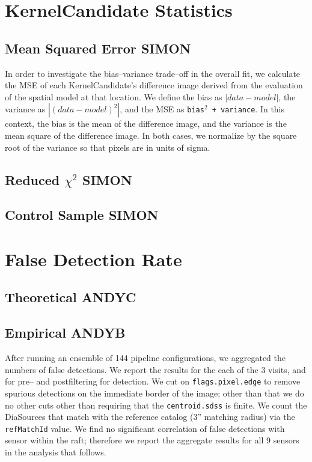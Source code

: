 \documentclass[prd, nofootinbib, floatfix, 11pt,tightenlines,times]{article}
\begin{document}
\section{KernelCandidate Statistics}

\subsection{Mean Squared Error {\bf SIMON}}

In order to investigate the bias--variance trade--off in the overall
fit, we calculate the MSE of each KernelCandidate's difference image
derived from the evaluation of the spatial model at that location.  We
define the bias as $\left| data - model \right|$, the variance as
$\left| (data - model)^2 \right|$, and the MSE as {\tt bias$^2$ +
  variance}.  In this context, the bias is the mean of the difference
image, and the variance is the mean square of the difference image.
In both cases, we normalize by the square root of the variance so that
pixels are in units of sigma.

\subsection{Reduced $\chi^2$ {\bf SIMON}}

\subsection{Control Sample {\bf SIMON}}

\section{False Detection Rate}

\subsection{Theoretical {\bf ANDYC}}

\subsection{Empirical {\bf ANDYB}}

After running an ensemble of 144 pipeline configurations, we
aggregated the numbers of false detections.  We report the results for
the each of the 3 visits, and for pre-- and postfiltering for
detection.  We cut on {\tt flags.pixel.edge} to remove spurious
detections on the immediate border of the image; other than that we do
no other cuts other than requiring that the {\tt centroid.sdss} is
finite.  We count the DiaSources that match with the reference catalog
(3'' matching radius) via the {\tt refMatchId} value.  We find no
significant correlation of false detections with sensor within the
raft; therefore we report the aggregate results for all 9 sensors in
the analysis that follows.
\end{document}
